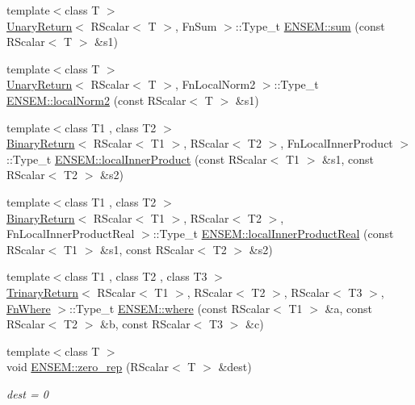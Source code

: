 \begin{DoxyCompactItemize}
{\footnotesize template$<$class T $>$ }\\\mbox{\hyperlink{structUnaryReturn}{Unary\+Return}}$<$ R\+Scalar$<$ T $>$, Fn\+Sum $>$\+::Type\+\_\+t \mbox{\hyperlink{group__rscalar_ga53401bdacfb693c17335cacfc5e9f6dd}{E\+N\+S\+E\+M\+::sum}} (const R\+Scalar$<$ T $>$ \&s1)
\item 
{\footnotesize template$<$class T $>$ }\\\mbox{\hyperlink{structUnaryReturn}{Unary\+Return}}$<$ R\+Scalar$<$ T $>$, Fn\+Local\+Norm2 $>$\+::Type\+\_\+t \mbox{\hyperlink{group__rscalar_ga3ca325ab0808bb3c4b966320b923c213}{E\+N\+S\+E\+M\+::local\+Norm2}} (const R\+Scalar$<$ T $>$ \&s1)
\item 
{\footnotesize template$<$class T1 , class T2 $>$ }\\\mbox{\hyperlink{structBinaryReturn}{Binary\+Return}}$<$ R\+Scalar$<$ T1 $>$, R\+Scalar$<$ T2 $>$, Fn\+Local\+Inner\+Product $>$\+::Type\+\_\+t \mbox{\hyperlink{group__rscalar_gadd76bb3801e8a4665498325bf9c7f6ae}{E\+N\+S\+E\+M\+::local\+Inner\+Product}} (const R\+Scalar$<$ T1 $>$ \&s1, const R\+Scalar$<$ T2 $>$ \&s2)
\item 
{\footnotesize template$<$class T1 , class T2 $>$ }\\\mbox{\hyperlink{structBinaryReturn}{Binary\+Return}}$<$ R\+Scalar$<$ T1 $>$, R\+Scalar$<$ T2 $>$, Fn\+Local\+Inner\+Product\+Real $>$\+::Type\+\_\+t \mbox{\hyperlink{group__rscalar_gafd6d5a4377919b182f234ffe0eea09b4}{E\+N\+S\+E\+M\+::local\+Inner\+Product\+Real}} (const R\+Scalar$<$ T1 $>$ \&s1, const R\+Scalar$<$ T2 $>$ \&s2)
\item 
{\footnotesize template$<$class T1 , class T2 , class T3 $>$ }\\\mbox{\hyperlink{structTrinaryReturn}{Trinary\+Return}}$<$ R\+Scalar$<$ T1 $>$, R\+Scalar$<$ T2 $>$, R\+Scalar$<$ T3 $>$, \mbox{\hyperlink{structFnWhere}{Fn\+Where}} $>$\+::Type\+\_\+t \mbox{\hyperlink{group__rscalar_gab32228a08de8d1e17ba1f7829c1aff56}{E\+N\+S\+E\+M\+::where}} (const R\+Scalar$<$ T1 $>$ \&a, const R\+Scalar$<$ T2 $>$ \&b, const R\+Scalar$<$ T3 $>$ \&c)
\item 
{\footnotesize template$<$class T $>$ }\\void \mbox{\hyperlink{group__rscalar_ga2d621f22841a02293225a92dcfcb4642}{E\+N\+S\+E\+M\+::zero\+\_\+rep}} (R\+Scalar$<$ T $>$ \&dest)
\begin{DoxyCompactList}\small\item\em dest = 0 \end{DoxyCompactList}\item 

\end{DoxyCompactItemize}
